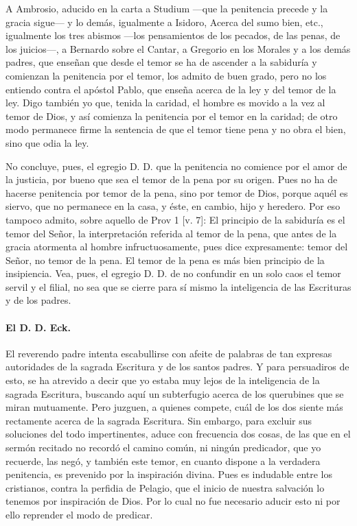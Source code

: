 A Ambrosio, aducido en la carta a Studium —que la penitencia precede y la gracia sigue— y lo demás, igualmente a Isidoro, Acerca del sumo bien, etc., igualmente los tres abismos —los pensamientos de los pecados, de las penas, de los juicios—, a Bernardo sobre el Cantar, a Gregorio en los Morales y a los demás padres, que enseñan que desde el temor se ha de ascender a la sabiduría y comienzan la penitencia por el temor, los admito de buen grado, pero no los entiendo contra el apóstol Pablo, que enseña acerca de la ley y del temor de la ley. Digo también yo que, tenida la caridad, el hombre es movido a la vez al temor de Dios, y así comienza la penitencia por el temor en la caridad; de otro modo permanece firme la sentencia de que el temor tiene pena y no obra el bien, sino que odia la ley.

No concluye, pues, el egregio D. D. que la penitencia no comience por el amor de la justicia, por bueno que sea el temor de la pena por su origen. Pues no ha de hacerse penitencia por temor de la pena, sino por temor de Dios, porque aquél es siervo, que no permanece en la casa, y éste, en cambio, hijo y heredero. Por eso tampoco admito, sobre aquello de Prov 1 [v. 7]: El principio de la sabiduría es el temor del Señor, la interpretación referida al temor de la pena, que antes de la gracia atormenta al hombre infructuosamente, pues dice expresamente: temor del Señor, no temor de la pena. El temor de la pena es más bien principio de la insipiencia. Vea, pues, el egregio D. D. de no confundir en un solo caos el temor servil y el filial, no sea que se cierre para sí mismo la inteligencia de las Escrituras y de los padres.

\paragraph*{El D. D. Eck.}

El reverendo padre intenta escabullirse con afeite de palabras de tan expresas autoridades de la sagrada Escritura y de los santos padres. Y para persuadiros de esto, se ha atrevido a decir que yo estaba muy lejos de la inteligencia de la sagrada Escritura, buscando aquí un subterfugio acerca de los querubines que se miran mutuamente. Pero juzguen, a quienes compete, cuál de los dos siente más rectamente acerca de la sagrada Escritura. Sin embargo, para excluir sus soluciones del todo impertinentes, aduce con frecuencia dos cosas, de las que en el sermón recitado no recordó el camino común, ni ningún predicador, que yo recuerde, las negó, y también este temor, en cuanto dispone a la verdadera penitencia, es prevenido por la inspiración divina. Pues es indudable entre los cristianos, contra la perfidia de Pelagio, que el inicio de nuestra salvación lo tenemos por inspiración de Dios. Por lo cual no fue necesario aducir esto ni por ello reprender el modo de predicar.

